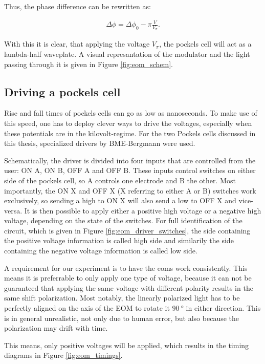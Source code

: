 Thus, the phase difference can be rewritten as:

\begin{align}
	\label{eq:eom_phase_diff}
	\Delta \phi = \Delta \phi_0 - \pi \frac{V}{V_\pi} .
\end{align}

With this it is clear, that applying the voltage $V_\pi$, the pockels cell will act as a lambda-half waveplate. A visual represantation of the modulator and the light passing through it is given in Figure \ref{fig:eom_schem}.

\subsection{Driving a pockels cell}

Rise and fall times of pockels cells can go as low as nanoseconds. To make use of this speed, one has to deploy clever ways to drive the voltages, especially when these potentials are in the kilovolt-regime. For the two Pockels cells discussed in this thesis, specialized drivers by BME-Bergmann were used.

Schematically, the driver is divided into four inputs that are controlled from the user: ON A, ON B, OFF A and OFF B. These inputs control switches on either side of the pockels cell, so A controls one electrode and B the other. Most importantly, the ON X and OFF X (X referring to either A or B) switches work exclusively, so sending a high to ON X will also send a low to OFF X and vice-versa. It is then possible to apply either a positive high voltage or a negative high voltage, depending on the state of the switches. For full identification of the circuit, which is given in Figure \ref{fig:eom_driver_switches}, the side containing the positive voltage information is called high side and similarily the side containing the negative voltage information is called low side.

A requirement for our experiment is to have the \acp{eom} work consistently. This means it is preferrable to only apply one type of voltage, because it can not be guaranteed that applying the same voltage with different polarity results in the same shift polarization. Most notably, the linearly polarized light has to be perfectly aligned on the axis of the EOM to rotate it $\SI{90}{\degree}$ in either direction. This is in general unrealistic, not only due to human error, but also because the polarization may drift with time.

This means, only positive voltages will be applied, which results in the timing diagrams in Figure \ref{fig:eom_timings}.

